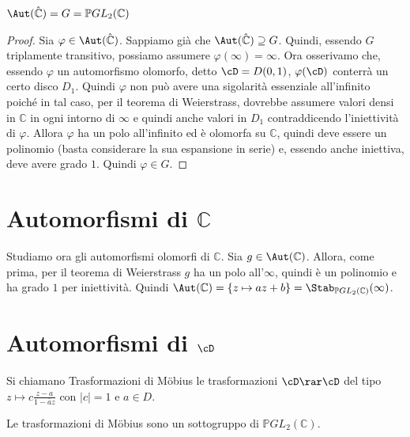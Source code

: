 \begin{proposizione}
$\Aut(\hat{\mathbb{C}} ) = G = \mathbb{P}GL_2 (\mathbb{C} )$
\end{proposizione}
\begin{proof}
Sia $\varphi \in \Aut (\hat{\mathbb{C}} )$. Sappiamo già che $\Aut (\hat{\mathbb{C}} ) \supseteq G$.
Quindi, essendo $G$ triplamente transitivo, possiamo assumere $\varphi( \infty ) = \infty$.
	Ora osserivamo che, essendo $\varphi$ un automorfismo olomorfo, detto $\cD=D(0,1)$, $\varphi (\cD)$ conterrà
un certo disco $D_1$. Quindi $\varphi$ non può avere una sigolarità essenziale all'infinito poiché in tal caso,
per il teorema di Weierstrass, dovrebbe assumere valori densi in $\mathbb{C}$ in ogni intorno di $\infty$
e quindi anche valori in $D_1$ contraddicendo l'iniettività di $\varphi$.
Allora $\varphi$ ha un polo all'infinito ed è olomorfa su $\mathbb{C}$, quindi deve essere un polinomio (basta considerare la sua espansione in serie) e,
essendo anche iniettiva, deve avere grado $1$. Quindi $\varphi \in G$.
\end{proof}


\section{Automorfismi di $\mathbb{C}$}
Studiamo ora gli automorfismi olomorfi di $\mathbb{C}$.
Sia $g \in \Aut(\mathbb{C})$. Allora, come prima, per il teorema di Weierstrass $g$ ha un polo all'$\infty$,
quindi è un polinomio e ha grado $1$ per iniettività. Quindi
$\Aut(\mathbb{C} )= \left\{ z\mapsto az+b \right\} = \Stab_{\mathbb{P} GL_2 (\mathbb{C})} (\infty )$.


\section{Automorfismi di $\cD$}
\begin{definizione}
	Si chiamano Trasformazioni di Möbius le trasformazioni $\cD \rar \cD$ del tipo $z\mapsto c \displaystyle{\frac{z-a}{1- \bar{a}z}}$ con $|c|=1$ e $a \in D$.
\end{definizione}


\begin{esercizio}
Le trasformazioni di Möbius sono un sottogruppo di $\mathbb{P} GL_2 (\mathbb{C})$.
\end{esercizio}

